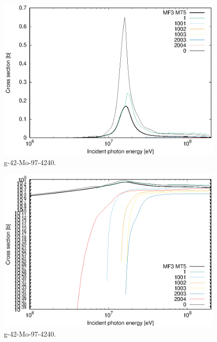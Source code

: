\begin{figure}
 \includegraphics[width=\linewidth]{eps/g_42-Mo-97_4240.eps}
  \caption{g-42-Mo-97-4240.}
\end{figure}
\begin{figure}
 \includegraphics[width=\linewidth]{eps-log/g_42-Mo-97_4240.eps}
 \caption{g-42-Mo-97-4240.}
\end{figure}
\newpage \clearpage

